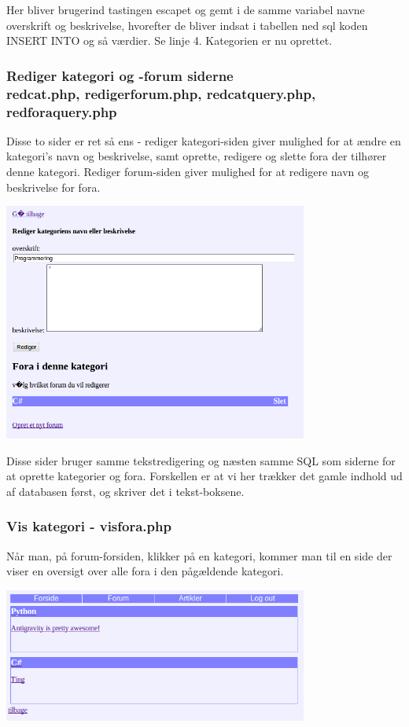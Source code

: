 \documentclass{article}
\begin{document}


Her bliver brugerind tastingen escapet og gemt i de samme variabel navne overskrift og beskrivelse, hvorefter de bliver indsat i tabellen ned sql koden INSERT INTO og så værdier. Se linje 4.
Kategorien er nu oprettet.

\subsubsection[Rediger kategori og -forum siderne]{Rediger kategori og -forum siderne \\redcat.php, redigerforum.php, redcatquery.php, redforaquery.php}
Disse to sider er ret så ens - rediger kategori-siden giver mulighed for at ændre en kategori's navn og beskrivelse, samt oprette, redigere og slette fora der tilhører denne kategori. Rediger forum-siden giver mulighed for at redigere navn og beskrivelse for fora.

\includegraphics[width=100mm]{mi02.png}

Disse sider bruger samme tekstredigering og næsten samme SQL som siderne for at oprette kategorier og fora. Forskellen er at vi her trækker det gamle indhold ud af databasen først, og skriver det i tekst-boksene.

\subsubsection[Vis kategori]{Vis kategori - visfora.php}
Når man, på forum-forsiden, klikker på en kategori, kommer man til en side der viser en oversigt over alle fora i den pågældende kategori. 

\includegraphics[width=100mm]{mi11.png}
\end{document}
